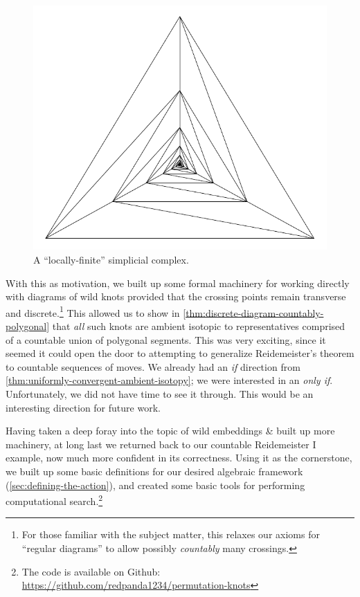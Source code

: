 \begin{figure}[H]
  \centering
  \includegraphics[scale=.5]{figures/wild/simp-comp-down.pdf}
  \caption{A ``locally-finite'' simplicial complex.}
\end{figure}
With this as motivation, we built up some formal machinery for working
directly with diagrams of wild knots provided that the crossing points
remain transverse and discrete.\footnote{For those familiar with the
  subject matter, this relaxes our axioms for ``regular diagrams'' to
  allow possibly \emph{countably} many crossings.} This allowed us to
show in \cref{thm:discrete-diagram-countably-polygonal} that
\emph{all} such knots are ambient isotopic to representatives
comprised of a countable union of polygonal segments. This was very
exciting, since it seemed it could open the door to attempting to
generalize Reidemeister's theorem to countable sequences of moves. We
already had an \emph{if} direction from
\cref{thm:uniformly-convergent-ambient-isotopy}; we were interested in
an \emph{only if}. Unfortunately, we did not have time to see it
through. This would be an interesting direction for future work.

Having taken a deep foray into the topic of wild embeddings \& built
up more machinery, at long last we returned back to our countable
Reidemeister I example, now much more confident in its correctness.
Using it as the cornerstone, we built up some basic definitions for
our desired algebraic framework (\cref{sec:defining-the-action}), and
created some basic tools for performing computational
search.\footnote{The code is available on Github:
  \url{https://github.com/redpanda1234/permutation-knots}}

